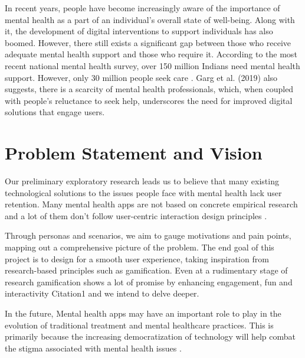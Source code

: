 \documentclass[manuscript,screen,review]{acmart}
\begin{document}
In recent years, people have become increasingly aware of the importance of mental health as a part of an individual's overall state of well-being. Along with it, the development of digital interventions to support individuals has also boomed. However, there still exists a significant gap between those who receive adequate mental health support and those who require it. According to the most recent national mental health survey, over 150 million Indians need mental health support. However, only 30 million people seek care \cite{Gautham2020}. Garg et al. \cite{Garg19} (2019) also suggests, there is a scarcity of mental health professionals, which, when coupled with people's reluctance to seek help, underscores the need for improved digital solutions that engage users.


\section{Problem Statement and Vision}

Our preliminary exploratory research leads us to believe that many existing technological solutions to the issues people face with mental health lack user retention. Many mental health apps are not based on concrete empirical research and a lot of them don’t follow user-centric interaction design principles \cite{Balcombe2022}.

Through personas and scenarios, we aim to gauge motivations and pain points, mapping out a comprehensive picture of the problem. The end goal of this project is to design for a smooth user experience, taking inspiration from research-based principles such as gamification. Even at a rudimentary stage of research gamification shows a lot of promise by enhancing engagement, fun and interactivity Citation1 and we intend to delve deeper.

In the future, Mental health apps may have an important role to play in the evolution of traditional treatment and mental healthcare practices. This is primarily because the increasing democratization of technology will help combat the stigma associated with mental health issues \cite{IGIGlobal}.
 
\end{document}
